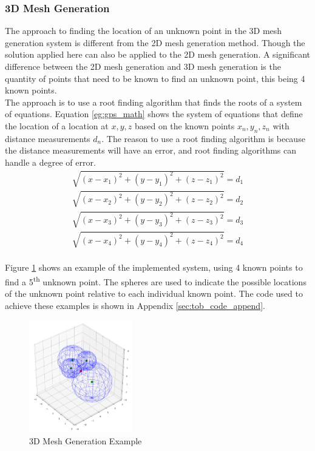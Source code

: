 \subsubsection{3D Mesh Generation}
The approach to finding the location of an unknown point in the 3D mesh generation system is different from the 2D mesh generation method. Though the solution applied here can also be applied to the 2D mesh generation. A significant difference between the 2D mesh generation and 3D mesh generation is the quantity of points that need to be known to find an unknown point, this being 4 known points.\\

The approach is to use a root finding algorithm that finds the roots of a system of equations. Equation \ref{eg:gps_math} shows the system of equations that define the location of a location at $x, y, z$ based on the known points $x_n, y_n, z_n$ with distance measurements $d_n$. The reason to use a root finding algorithm is because the distance measurements will have an error, and root finding algorithms can handle a degree of error.\\

\begin{equation} \label{eg:gps_math}
	\begin{matrix}
		\sqrt{(x-x_1)^2+(y-y_1)^2+(z-z_1)^2} = d_1\\
		\sqrt{(x-x_2)^2+(y-y_2)^2+(z-z_2)^2} = d_2\\
		\sqrt{(x-x_3)^2+(y-y_3)^2+(z-z_3)^2} = d_3\\
		\sqrt{(x-x_4)^2+(y-y_4)^2+(z-z_4)^2} = d_4
	\end{matrix}
\end{equation}\\

Figure \ref{fig:3d_mesh_ex} shows an example of the implemented system, using 4 known points to find a 5\textsuperscript{th} unknown point. The spheres are used to indicate the possible locations of the unknown point relative to each individual known point. The code used to achieve these examples is shown in Appendix \ref{sec:tob_code_append}.

\begin{figure}[H]
	\centering
	\noindent\includegraphics[width=0.4\textwidth]{images/3d_mesh_sph.png}
	\caption{3D Mesh Generation Example}
	\label{fig:3d_mesh_ex}
\end{figure}


